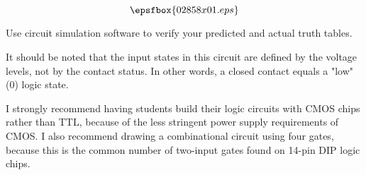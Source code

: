 

$$\epsfbox{02858x01.eps}$$

\vfil \eject






Use circuit simulation software to verify your predicted and actual truth tables.







It should be noted that the input states in this circuit are defined by the voltage levels, not by the contact status.  In other words, a closed contact equals a "low" (0) logic state.

I strongly recommend having students build their logic circuits with CMOS chips rather than TTL, because of the less stringent power supply requirements of CMOS.  I also recommend drawing a combinational circuit using four gates, because this is the common number of two-input gates found on 14-pin DIP logic chips.




